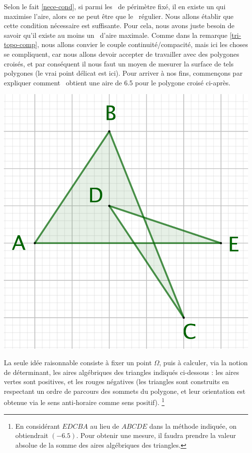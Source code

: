 Selon le fait \ref{nece-cond}, si parmi les \ngones\ de périmètre fixé, il en existe un qui maximise l'aire, alors ce ne peut être que le \ngone\ régulier. Nous allons établir que cette condition nécessaire est suffisante. Pour cela, nous avons juste besoin de savoir qu'il existe au moins un \ngone\ d'aire maximale.
Comme dans la remarque \ref{tri-topo-comp}, nous allons convier le couple continuité/compacité, mais ici les choses se compliquent, car nous allons devoir accepter de travailler avec des polygones croisés, et par conséquent il nous faut un moyen de mesurer la surface de tels polygones (le vrai point délicat est ici). 
Pour arriver à nos fins, commençons par expliquer comment \geogebra\ obtient une aire de \num{6.5} pour le polygone croisé ci-après.


\begin{center}
	\includegraphics[scale=.4]{content/polygon/sufficient-cond/g-area-why.png}
\end{center}


\medskip
 

La seule idée raisonnable consiste à fixer un point $\Omega$, puis à calculer, via la notion de déterminant, les aires algébriques des triangles indiqués ci-dessous : les aires vertes sont positives, et les rouges négatives (les triangles sont construits en respectant un ordre de parcours des sommets du polygone, et leur orientation est obtenue via le sens anti-horaire comme sens positif).%
\footnote{
	En considérant $EDCBA$ au lieu de $ABCDE$ dans la méthode indiquée, on obtiendrait $(\num{-6.5})$. Pour obtenir une mesure, il faudra prendre la valeur absolue de la somme des aires algébriques des triangles.
}

